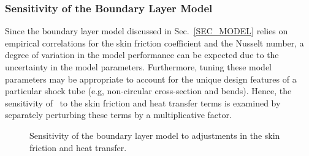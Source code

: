 \subsubsection{Sensitivity of the Boundary Layer Model}
Since the boundary layer model discussed in Sec.~\ref{SEC_MODEL} relies on empirical correlations for the skin friction coefficient and the Nusselt number, a degree of variation in the model performance can be expected due to the uncertainty in the model parameters. Furthermore, tuning these model parameters may be appropriate to account for the unique design features of a particular shock tube (e.g, non-circular cross-section and bends). Hence, the sensitivity of \stnshk\ to the skin friction and heat transfer terms is examined by separately perturbing these terms by a multiplicative factor.

\begin{figure}[!h!]
	\centering
	\caption{\label{FIG_SENSANAL} Sensitivity of the boundary layer model to adjustments in the skin friction and heat transfer.}
\end{figure}

